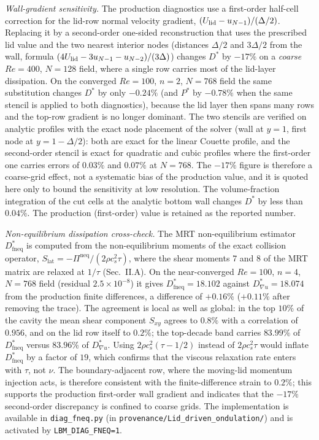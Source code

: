 \emph{Wall-gradient sensitivity.} The production diagnostics use a first-order half-cell correction for the lid-row normal velocity gradient, $(U_{\rm lid}-u_{N-1})/(\Delta/2)$. Replacing it by a second-order one-sided reconstruction that uses the prescribed lid value and the two nearest interior nodes (distances $\Delta/2$ and $3\Delta/2$ from the wall, formula $(4U_{\rm lid}-3u_{N-1}-u_{N-2})/(3\Delta)$) changes $D^*$ by $-17\%$ on a \emph{coarse} $Re=400$, $N=128$ field, where a single row carries most of the lid-layer dissipation. On the converged $Re=100$, $n=2$, $N=768$ field the same substitution changes $D^*$ by only $-0.24\%$ (and $P^*$ by $-0.78\%$ when the same stencil is applied to both diagnostics), because the lid layer then spans many rows and the top-row gradient is no longer dominant. The two stencils are verified on analytic profiles with the exact node placement of the solver (wall at $y=1$, first node at $y=1-\Delta/2$): both are exact for the linear Couette profile, and the second-order stencil is exact for quadratic and cubic profiles where the first-order one carries errors of $0.03\%$ and $0.07\%$ at $N=768$. The $-17\%$ figure is therefore a coarse-grid effect, not a systematic bias of the production value, and it is quoted here only to bound the sensitivity at low resolution. The volume-fraction integration of the cut cells at the analytic bottom wall changes $D^*$ by less than $0.04\%$. The production (first-order) value is retained as the reported number.

\emph{Non-equilibrium dissipation cross-check.} The MRT non-equilibrium estimator $D^*_{\mathrm{fneq}}$ is computed from the non-equilibrium moments of the exact collision operator, $S_{\mathrm{lat}}=-\Pi^{\mathrm{neq}}/(2\rho c_s^2\tau)$, where the shear moments 7 and 8 of the MRT matrix are relaxed at $1/\tau$ (Sec.~II.A). On the near-converged $Re=100$, $n=4$, $N=768$ field (residual $2.5\times10^{-8}$) it gives $D^*_{\mathrm{fneq}}=18.102$ against $D^*_{\nabla u}=18.074$ from the production finite differences, a difference of $+0.16\%$ ($+0.11\%$ after removing the trace). The agreement is local as well as global: in the top $10\%$ of the cavity the mean shear component $S_{xy}$ agrees to $0.8\%$ with a correlation of $0.956$, and on the lid row itself to $0.2\%$; the top-decade band carries $83.99\%$ of $D^*_{\mathrm{fneq}}$ versus $83.96\%$ of $D^*_{\nabla u}$. Using $2\rho c_s^2(\tau-1/2)$ instead of $2\rho c_s^2\tau$ would inflate $D^*_{\mathrm{fneq}}$ by a factor of $19$, which confirms that the viscous relaxation rate enters with $\tau$, not $\nu$. The boundary-adjacent row, where the moving-lid momentum injection acts, is therefore consistent with the finite-difference strain to $0.2\%$; this supports the production first-order wall gradient and indicates that the $-17\%$ second-order discrepancy is confined to coarse grids. The implementation is available in \texttt{diag\_fneq.py} (in \texttt{provenance/Lid\_driven\_ondulation/}) and is activated by \texttt{LBM\_DIAG\_FNEQ=1}.


